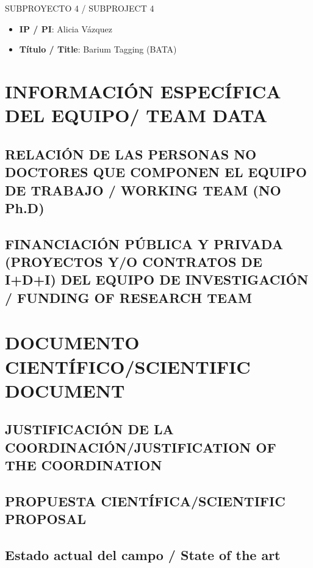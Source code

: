 \documentclass[a4paper,11pt,oneside]{article}
\begin{document}
{\sc SUBPROYECTO 4 / SUBPROJECT 4}

\begin{itemize}
\item {\bf IP / PI}: Alicia Vázquez
\item {\bf Título / Title}: Barium Tagging  (BATA)
\end{itemize}

\newpage
\setcounter{page}{1}

\section{INFORMACIÓN ESPECÍFICA DEL EQUIPO/ TEAM DATA}

\subsection{RELACIÓN DE LAS PERSONAS NO DOCTORES QUE COMPONEN EL EQUIPO DE TRABAJO / WORKING TEAM (NO Ph.D) }


\subsection{FINANCIACIÓN PÚBLICA Y PRIVADA (PROYECTOS Y/O CONTRATOS DE I+D+I) DEL EQUIPO DE INVESTIGACIÓN / FUNDING OF RESEARCH TEAM}



\newpage
\setcounter{page}{1}

\section{\bf DOCUMENTO CIENTÍFICO/SCIENTIFIC DOCUMENT}

\subsection{JUSTIFICACIÓN DE LA COORDINACIÓN/JUSTIFICATION OF THE COORDINATION}
\vspace{0.3cm}



\subsection{\bf PROPUESTA CIENTÍFICA/SCIENTIFIC PROPOSAL}
\subsection*{Estado actual del campo / State of the art}

\end{document}
